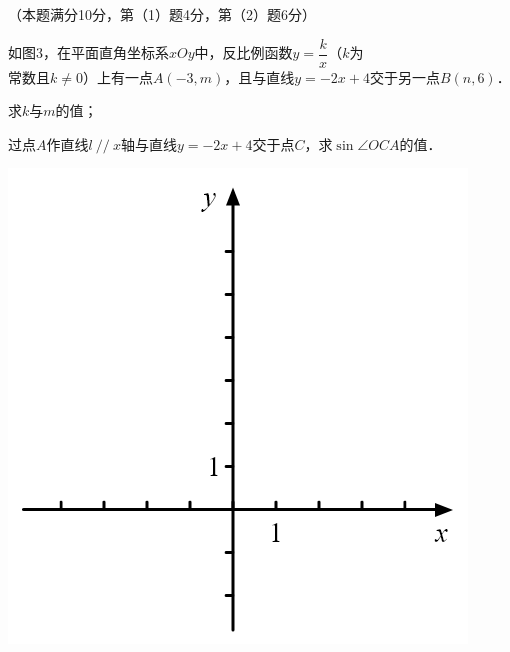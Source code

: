 \documentclass{article}
\begin{document}
\begin{question}[21]
    \item （本题满分10分，第（1）题4分，第（2）题6分）\\[5pt]
    \begin{minipage}[t]{.6\textwidth}
        如图3，在平面直角坐标系$xOy$中，反比例函数$y=\dfrac{k}{x}$（$k$为 \\[5pt]
        常数且$k\neq 0$）上有一点$A(-3,m)$，且与直线$y=-2x+4$交于另一点$B(n,6)$．
        \begin{squestion}
            \item 求$k$与$m$的值；
            \item 过点$A$作直线$l~//~x$轴与直线$y=-2x+4$交于点$C$，求$\sin \angle OCA$的值．
        \end{squestion}
    \end{minipage}
    \begin{minipage}[t]{.4\textwidth}
        \centering
        \vspace{-2ex}
        \includegraphics[scale=0.3]{images/p3.png}
    \end{minipage}
\end{question} \leavevmode
\end{document}
